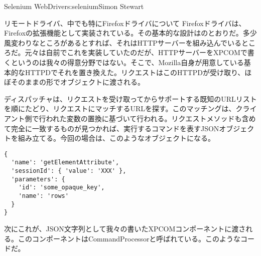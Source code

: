\begin{aosachapter}{Selenium WebDriver}{s:selenium}{Simon Stewart}
\begin{aosasect1}{リモートドライバ、中でも特にFirefoxドライバについて}
Firefoxドライバは、Firefoxの拡張機能として実装されている。その基本的な設計はのとおりだ。多少風変わりなところがあるとすれば、それはHTTPサーバーを組み込んでいるところだ。元々は自前でこれを実装していたのだが、HTTPサーバーをXPCOMで書くというのは我々の得意分野ではない。そこで、Mozilla自身が用意している基本的なHTTPDでそれを置き換えた。リクエストはこのHTTPDが受け取り、ほぼそのままの形でオブジェクトに渡される。

ディスパッチャは、リクエストを受け取ってからサポートする既知のURLリストを順にたどり、リクエストにマッチするURLを探す。このマッチングは、クライアント側で行われた変数の置換に基づいて行われる。リクエストメソッドも含めて完全に一致するものが見つかれば、実行するコマンドを表すJSONオブジェクトを組み立てる。今回の場合は、このようなオブジェクトになる。

\begin{verbatim}
{
  'name': 'getElementAttribute',
  'sessionId': { 'value': 'XXX' },
  'parameters': {
    'id': 'some_opaque_key',
    'name': 'rows'
  }
}
\end{verbatim}

\noindent 次にこれが、JSON文字列として我々の書いたXPCOMコンポーネントに渡される。このコンポーネントはCommandProcessorと呼ばれている。このようなコードだ。



\end{aosasect1}
\end{aosachapter}
